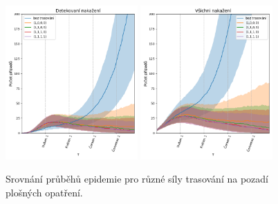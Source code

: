 \begin{figure}[ht]
  \centering
  \includegraphics[width=0.45\textwidth]{pic/history_second_expB_detected_iqr.png}
  \includegraphics[width=0.45\textwidth]{pic/history_second_expB_all_iqr.png}
  \caption{Srovnání průběhů epidemie pro různé síly trasování na pozadí plošných opatření.}
  \label{pg:fig:exp1b}
\end{figure}


